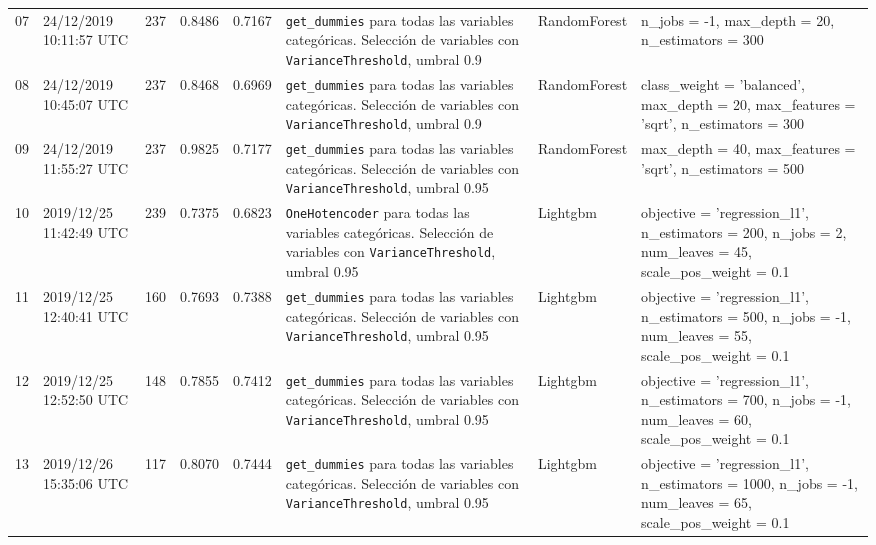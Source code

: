 \documentclass[a4paper, 20pt]{article}
\begin{document}
\begin{longtable}{lL{2cm}lllL{3cm}L{2.5cm}L{3.5cm}}
07 & 24/12/2019 10:11:57 UTC & 237 & 0.8486 & 0.7167 & \texttt{get\_dummies} para todas las variables categóricas. Selección de variables con \texttt{VarianceThreshold}, umbral 0.9 & RandomForest & {\ttfamily n\_jobs = -1, max\_depth = 20, n\_estimators = 300}\\

08 & 24/12/2019 10:45:07 UTC & 237 & 0.8468 & 0.6969 & \texttt{get\_dummies} para todas las variables categóricas. Selección de variables con \texttt{VarianceThreshold}, umbral 0.9 & RandomForest & {\ttfamily class\_weight = 'balanced', max\_depth = 20, max\_features = 'sqrt', n\_estimators = 300}\\

09 & 24/12/2019 11:55:27 UTC & 237 & 0.9825 & 0.7177 & \texttt{get\_dummies} para todas las variables categóricas. Selección de variables con \texttt{VarianceThreshold}, umbral 0.95 & RandomForest & {\ttfamily max\_depth = 40, max\_features = 'sqrt', n\_estimators = 500}\\

10 & 2019/12/25 11:42:49 UTC & 239 & 0.7375 & 0.6823 & \texttt{OneHotencoder} para todas las variables categóricas. Selección de variables con \texttt{VarianceThreshold}, umbral 0.95 & Lightgbm & {\ttfamily objective = 'regression\_l1', n\_estimators = 200, n\_jobs = 2, num\_leaves = 45, scale\_pos\_weight = 0.1}\\

11 & 2019/12/25 12:40:41 UTC & 160 & 0.7693 & 0.7388 & \texttt{get\_dummies} para todas las variables categóricas. Selección de variables con \texttt{VarianceThreshold}, umbral 0.95 & Lightgbm & {\ttfamily objective = 'regression\_l1', n\_estimators = 500, n\_jobs = -1, num\_leaves = 55, scale\_pos\_weight = 0.1}\\

12 & 2019/12/25 12:52:50 UTC & 148 & 0.7855 & 0.7412 & \texttt{get\_dummies} para todas las variables categóricas. Selección de variables con \texttt{VarianceThreshold}, umbral 0.95 & Lightgbm & {\ttfamily objective = 'regression\_l1', n\_estimators = 700, n\_jobs = -1, num\_leaves = 60, scale\_pos\_weight = 0.1}\\

13 & 2019/12/26 15:35:06 UTC & 117 & 0.8070 & 0.7444 & \texttt{get\_dummies} para todas las variables categóricas. Selección de variables con \texttt{VarianceThreshold}, umbral 0.95 & Lightgbm & {\ttfamily objective = 'regression\_l1', n\_estimators = 1000, n\_jobs = -1, num\_leaves = 65, scale\_pos\_weight = 0.1}\\


\end{longtable}
\end{document}
